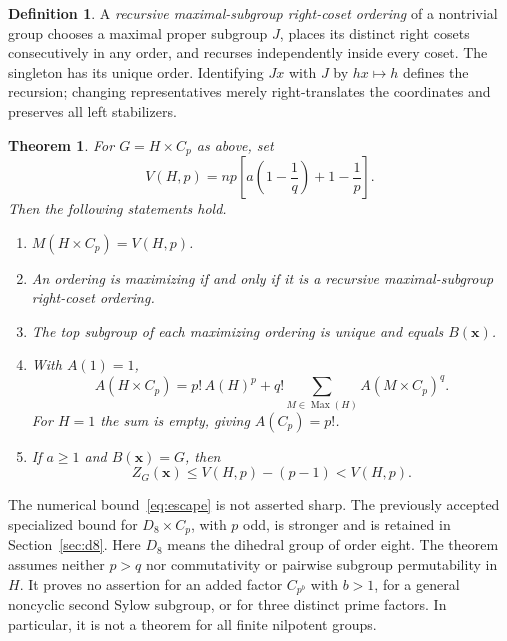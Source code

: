 \documentclass[11pt,letterpaper]{article}
\newtheorem{theorem}{Theorem}
\theoremstyle{definition}
\newtheorem{definition}{Definition}
\newcommand{\Max}{\operatorname{Max}}
\begin{document}
\begin{definition}
A \emph{recursive maximal-subgroup right-coset ordering} of a nontrivial group chooses a maximal proper subgroup $J$, places its distinct right cosets consecutively in any order, and recurses independently inside every coset. The singleton has its unique order. Identifying $Jx$ with $J$ by $hx\mapsto h$ defines the recursion; changing representatives merely right-translates the coordinates and preserves all left stabilizers.
\end{definition}

\begin{theorem}\label{thm:main}
For $G=H\times C_p$ as above, set
\begin{equation}
V(H,p)=np\left[a\left(1-\frac1q\right)+1-\frac1p\right].\label{eq:value}
\end{equation}
Then the following statements hold.
\begin{enumerate}
\item $M(H\times C_p)=V(H,p)$.
\item An ordering is maximizing if and only if it is a recursive maximal-subgroup right-coset ordering.
\item The top subgroup of each maximizing ordering is unique and equals $B(\mathbf{x})$.
\item With $A(1)=1$,
\begin{equation}
A(H\times C_p)=p!\,A(H)^p+q!\sum_{M\in\Max(H)}A(M\times C_p)^q.\label{eq:count}
\end{equation}
For $H=1$ the sum is empty, giving $A(C_p)=p!$.
\item If $a\ge1$ and $B(\mathbf{x})=G$, then
\begin{equation}
Z_G(\mathbf{x})\le V(H,p)-(p-1)<V(H,p).\label{eq:escape}
\end{equation}
\end{enumerate}
\end{theorem}

The numerical bound~\eqref{eq:escape} is not asserted sharp. The previously accepted specialized bound for $D_8\times C_p$, with $p$ odd, is stronger and is retained in Section~\ref{sec:d8}. Here $D_8$ means the dihedral group of order eight. The theorem assumes neither $p>q$ nor commutativity or pairwise subgroup permutability in $H$. It proves no assertion for an added factor $C_{p^b}$ with $b>1$, for a general noncyclic second Sylow subgroup, or for three distinct prime factors. In particular, it is not a theorem for all finite nilpotent groups.
\end{document}

